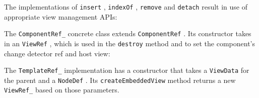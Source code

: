 The implementations of
\texttt{insert}
,
\texttt{indexOf}
,
\texttt{remove}
and
\texttt{detach}
result in use of
appropriate view management APIs:



The
\texttt{ComponentRef\_}
concrete class extends
\texttt{ComponentRef}
. Its constructor takes in an
\texttt{ViewRef}
, which is used in the
\texttt{destroy}
method and to set the component’s change
detector ref and host view:



The
\texttt{TemplateRef\_}
implementation has a constructor that takes a
\texttt{ViewData}
for the
parent and a
\texttt{NodeDef}
. Its
\texttt{createEmbeddedView}
method returns a new
\texttt{ViewRef\_}
based on those parameters.


